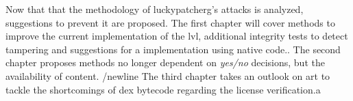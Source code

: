 Now that that the methodology of \gls{luckypatcherg}'s attacks is analyzed, suggestions to prevent it are proposed.
\newline
The first chapter will cover methods to improve the current implementation of the \gls{lvl}, additional integrity tests to detect tampering and suggestions for a implementation using native code..
\newline
The second chapter proposes methods no longer dependent on \textit{yes/no} decisions, but the availability of content.
/newline
The third chapter takes an outlook on \gls{art} to tackle the shortcomings of dex bytecode regarding the license verification.a
